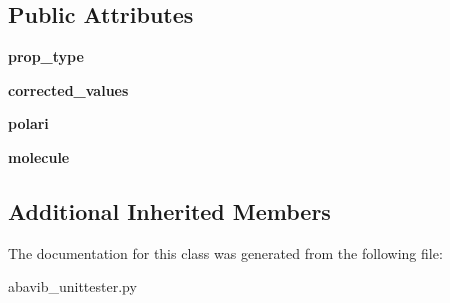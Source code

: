 \subsection*{Public Attributes}
\begin{DoxyCompactItemize}
\item 
\hypertarget{classabavib__unittester_1_1polarizability__test_aed2bb9a607338be4fefece3f8dc656ec}{{\bfseries prop\+\_\+type}}\label{classabavib__unittester_1_1polarizability__test_aed2bb9a607338be4fefece3f8dc656ec}

\item 
\hypertarget{classabavib__unittester_1_1polarizability__test_a8b710465395086dc0021c69cfc5ffa72}{{\bfseries corrected\+\_\+values}}\label{classabavib__unittester_1_1polarizability__test_a8b710465395086dc0021c69cfc5ffa72}

\item 
\hypertarget{classabavib__unittester_1_1polarizability__test_a989c132876fa2dccdcd31084809f8baa}{{\bfseries polari}}\label{classabavib__unittester_1_1polarizability__test_a989c132876fa2dccdcd31084809f8baa}

\item 
\hypertarget{classabavib__unittester_1_1polarizability__test_a588b4edea8db1a49cb2e7098459ca04b}{{\bfseries molecule}}\label{classabavib__unittester_1_1polarizability__test_a588b4edea8db1a49cb2e7098459ca04b}

\end{DoxyCompactItemize}
\subsection*{Additional Inherited Members}


The documentation for this class was generated from the following file\+:\begin{DoxyCompactItemize}
\item 
abavib\+\_\+unittester.\+py\end{DoxyCompactItemize}
